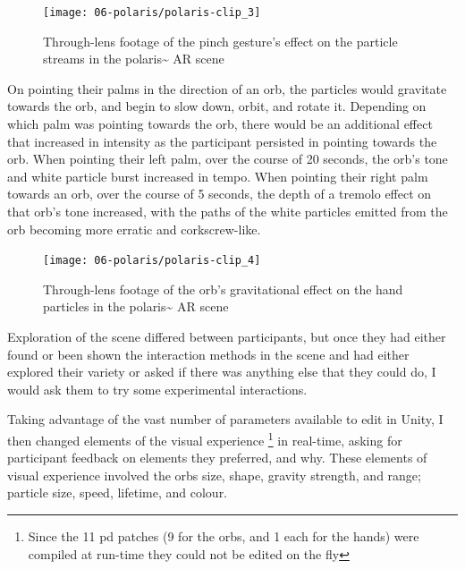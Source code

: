 \begin{figure}[ht]
    \centering
    \texttt{[image: 06-polaris/polaris-clip\_3]}
    \captionsetup{justification=centering,margin=1.5cm}
    \caption{Through-lens footage of the pinch gesture's effect on the particle streams in the polaris\textasciitilde{} AR scene \citep[from][\href{https://youtu.be/lCBgMs8ULj0?t=476}{at 7:56}]{bilbow2022c}}\label{fig: polaris-clip_3}
\end{figure}

On pointing their palms in the direction of an orb, the particles would gravitate towards the orb, and begin to slow down, orbit, and rotate it. Depending on which palm was pointing towards the orb, there would be an additional effect that increased in intensity as the participant persisted in pointing towards the orb. When pointing their left palm, over the course of 20 seconds, the orb's tone and white particle burst increased in tempo. When pointing their right palm towards an orb, over the course of 5 seconds, the depth of a tremolo effect on that orb's tone increased, with the paths of the white particles emitted from the orb becoming more erratic and corkscrew-like.

\begin{figure}[ht]
    \centering
    \texttt{[image: 06-polaris/polaris-clip\_4]}
    \captionsetup{justification=centering,margin=1.5cm}
    \caption{Through-lens footage of the orb's gravitational effect on the hand particles in the polaris\textasciitilde{} AR scene \citep[from][\href{https://youtu.be/lCBgMs8ULj0?t=495}{at 8:14}]{bilbow2022c}}\label{fig: polaris-clip_4}
\end{figure}

Exploration of the scene differed between participants, but once they had either found or been shown the interaction methods in the scene and had either explored their variety or asked if there was anything else that they could do, I would ask them to try some experimental interactions.

Taking advantage of the vast number of parameters available to edit in Unity, I then changed elements of the visual   experience \footnote{Since the 11 \gls{pd} patches (9 for the orbs, and 1 each for the hands) were compiled at run-time they could not be edited on the fly} in real-time, asking for participant feedback on elements they preferred, and why. These elements of visual experience involved the orbs size, shape, gravity strength, and range; particle size, speed, lifetime, and colour.

